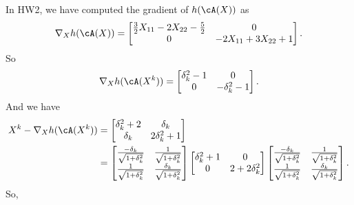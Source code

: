 In HW2,
we have computed the gradient of $h(\cA(X))$ as
\begin{equation}
    \nabla_X h(\cA(X)) =
    \begin{bmatrix}
        \frac{3}{2}X_{11}-2X_{22}-\frac{5}{2} & 0 \\
        0   & -2X_{11}+3X_{22}+1 \\
    \end{bmatrix}.
\end{equation}
So
\begin{equation}
    \nabla_X h(\cA(X^k)) =
    \begin{bmatrix}
        \delta_k^2-1 & 0 \\
        0   & -\delta_k^2-1 \\
    \end{bmatrix}.
\end{equation}
And we have
\begin{equation}
\begin{split}
    X^k-\nabla_X h(\cA(X^k))
    &=\begin{bmatrix}
        \delta_k^2+2 & \delta_k \\
        \delta_k    & 2\delta_k^2+1 \\
    \end{bmatrix} \\
    &= \begin{bmatrix}
        \frac{-\delta_k}{\sqrt{1+\delta_k^2}} & \frac{1}{\sqrt{1+\delta_k^2}} \\
        \frac{1}{\sqrt{1+\delta_k^2}}  & \frac{\delta_k}{\sqrt{1+\delta_k^2}} \\
    \end{bmatrix}
    \begin{bmatrix}
        \delta_k^2+1 & 0 \\
        0  & 2+2\delta_k^2 \\
    \end{bmatrix}
    \begin{bmatrix}
        \frac{-\delta_k}{\sqrt{1+\delta_k^2}} & \frac{1}{\sqrt{1+\delta_k^2}} \\
        \frac{1}{\sqrt{1+\delta_k^2}}  & \frac{\delta_k}{\sqrt{1+\delta_k^2}} \\
    \end{bmatrix}. \\
\end{split}
\end{equation}
So,
